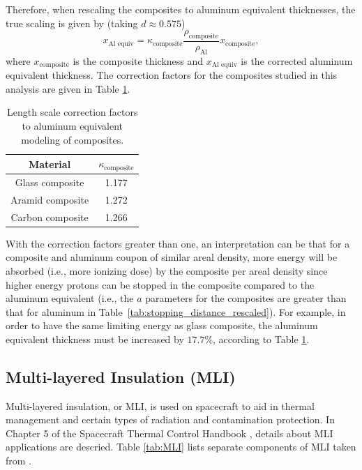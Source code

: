 \documentclass{hitec}
\begin{document}
Therefore, when rescaling the composites to aluminum equivalent thicknesses, the true scaling is given by (taking $d\approx 0.575$)
\begin{equation}\label{eq:al_equiv_thickness_conversion}
x_{\text{Al equiv}} = \kappa_{\text{composite}}\frac{\rho_{\text{composite}}}{\rho_{\text{Al}}}x_{\text{composite}},
\end{equation}
where $x_{\text{composite}}$ is the composite thickness and $x_{\text{Al equiv}}$ is the corrected aluminum equivalent thickness. The correction factors for the composites studied in this analysis are given in Table \ref{tab:correction_factors}.

\begin{table}[h]\centering
	\caption{Length scale correction factors to aluminum equivalent modeling of composites.}\label{tab:correction_factors}
	\begin{tabular}{|c | c |}\hline
		Material & $\kappa_{\text{composite}}$ \\\hline
		Glass composite  & 1.177 \\\hline
		Aramid composite & 1.272   \\\hline
		Carbon composite & 1.266 \\\hline
	\end{tabular}
\end{table}

With the correction factors greater than one, an interpretation can be that for a composite and aluminum coupon of similar areal density, more energy will be absorbed (i.e., more ionizing dose) by the composite per areal density since higher energy protons can be stopped in the composite compared to the aluminum equivalent (i.e., the $a$ parameters for the composites are greater than that for aluminum in Table~\ref{tab:stopping_distance_rescaled}). For example, in order to have the same limiting energy as glass composite, the aluminum equivalent thickness must be increased by $17.7\%$, according to Table \ref{tab:correction_factors}.

\subsection{Multi-layered Insulation (MLI)}\label{ssec:MLI}

Multi-layered insulation, or MLI, is used on spacecraft to aid in thermal management and certain types of radiation and contamination protection. In Chapter 5 of the Spacecraft Thermal Control Handbook \citep{donabedian2003spacecraft}, details about MLI applications are descried. Table \ref{tab:MLI} lists separate components of MLI taken from \cite{donabedian2003spacecraft}.
\end{document}

